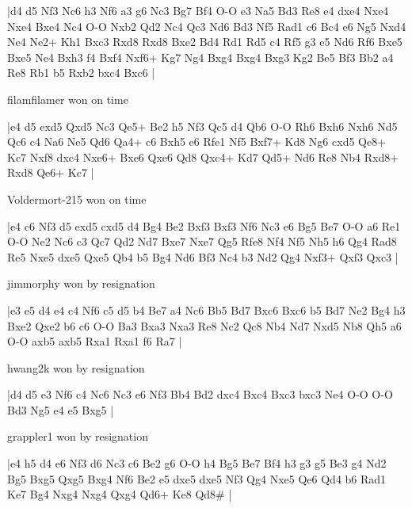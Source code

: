 \makegametitle
|d4 d5 Nf3 Nc6 h3 Nf6 a3 g6 Nc3 Bg7 Bf4 O-O e3 Na5 Bd3 Re8 e4 dxe4 Nxe4 Nxe4 Bxe4 Nc4 O-O Nxb2 Qd2 Nc4 Qc3 Nd6 Bd3 Nf5 Rad1 c6 Bc4 e6 Ng5 Nxd4 Ne4 Ne2+ Kh1 Bxc3 Rxd8 Rxd8 Bxe2 Bd4 Rd1 Rd5 c4 Rf5 g3 e5 Nd6 Rf6 Bxe5 Bxe5 Ne4 Bxh3 f4 Bxf4 Nxf6+ Kg7 Ng4 Bxg4 Bxg4 Bxg3 Kg2 Be5 Bf3 Bb2 a4 Re8 Rb1 b5 Rxb2 bxc4 Bxc6  |

\showboard

filamfilamer won on time

\makegametitle
|e4 d5 exd5 Qxd5 Nc3 Qe5+ Be2 h5 Nf3 Qc5 d4 Qb6 O-O Rh6 Bxh6 Nxh6 Nd5 Qc6 c4 Na6 Ne5 Qd6 Qa4+ c6 Bxh5 e6 Rfe1 Nf5 Bxf7+ Kd8 Ng6 cxd5 Qe8+ Kc7 Nxf8 dxc4 Nxe6+ Bxe6 Qxe6 Qd8 Qxc4+ Kd7 Qd5+ Nd6 Re8 Nb4 Rxd8+ Rxd8 Qe6+ Kc7  |

\showboard

Voldermort-215 won on time

\makegametitle
|e4 c6 Nf3 d5 exd5 cxd5 d4 Bg4 Be2 Bxf3 Bxf3 Nf6 Nc3 e6 Bg5 Be7 O-O a6 Re1 O-O Ne2 Nc6 c3 Qc7 Qd2 Nd7 Bxe7 Nxe7 Qg5 Rfe8 Nf4 Nf5 Nh5 h6 Qg4 Rad8 Re5 Nxe5 dxe5 Qxe5 Qb4 b5 Bg4 Nd6 Bf3 Nc4 b3 Nd2 Qg4 Nxf3+ Qxf3 Qxc3  |

\showboard

jimmorphy won by resignation

\makegametitle
|e3 e5 d4 e4 c4 Nf6 c5 d5 b4 Be7 a4 Nc6 Bb5 Bd7 Bxc6 Bxc6 b5 Bd7 Ne2 Bg4 h3 Bxe2 Qxe2 b6 c6 O-O Ba3 Bxa3 Nxa3 Re8 Nc2 Qc8 Nb4 Nd7 Nxd5 Nb8 Qh5 a6 O-O axb5 axb5 Rxa1 Rxa1 f6 Ra7  |

\showboard

hwang2k won by resignation

\makegametitle
|d4 d5 e3 Nf6 c4 Nc6 Nc3 e6 Nf3 Bb4 Bd2 dxc4 Bxc4 Bxc3 bxc3 Ne4 O-O O-O Bd3 Ng5 e4 e5 Bxg5  |

\showboard

grappler1 won by resignation

\makegametitle
|e4 h5 d4 e6 Nf3 d6 Nc3 c6 Be2 g6 O-O h4 Bg5 Be7 Bf4 h3 g3 g5 Be3 g4 Nd2 Bg5 Bxg5 Qxg5 Bxg4 Nf6 Be2 e5 dxe5 dxe5 Nf3 Qg4 Nxe5 Qe6 Qd4 b6 Rad1 Ke7 Bg4 Nxg4 Nxg4 Qxg4 Qd6+ Ke8 Qd8\#  |

